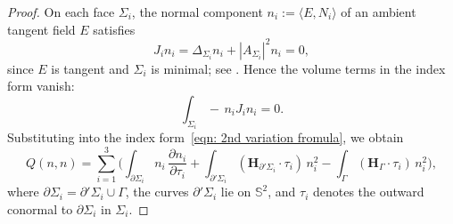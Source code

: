 \documentclass[11pt]{amsart}
\numberwithin{equation}{section}
\theoremstyle{theorem}
\theoremstyle{definition}
\numberwithin{equation}{section}
\begin{document}
\begin{proof}
On each face $\Sigma_i$, the normal component $n_i := \langle E, N_i\rangle$ of an ambient tangent field $E$ satisfies
\[
J_i n_i = \Delta_{\Sigma_i}n_i + |A_{\Sigma_i}|^2 n_i = 0,
\]
since $E$ is tangent and $\Sigma_i$ is minimal; see \cite{colding2011course}.
Hence the volume terms in the index form vanish:
\[
\int_{\Sigma_i} -\,n_i J_i n_i = 0.
\]
Substituting into the index form~\eqref{eqn: 2nd variation fromula}, we obtain
\[
Q(n,n)
= \sum_{i=1}^3 \Big( \int_{\partial\Sigma_i} n_i\,\frac{\partial n_i}{\partial \tau_i}
+ \int_{\partial'\Sigma_i} (\boldsymbol{H}_{\partial'\Sigma_i}\!\cdot\!\tau_i)\,n_i^2
- \int_{\Gamma} (\boldsymbol{H}_{\Gamma}\!\cdot\!\tau_i)\,n_i^2 \Big),
\]
where $\partial\Sigma_i=\partial'\Sigma_i\cup\Gamma$, the curves $\partial'\Sigma_i$ lie on $\mathbb{S}^2$, and $\tau_i$ denotes the outward conormal to $\partial\Sigma_i$ in $\Sigma_i$.


\end{proof}
\end{document}
